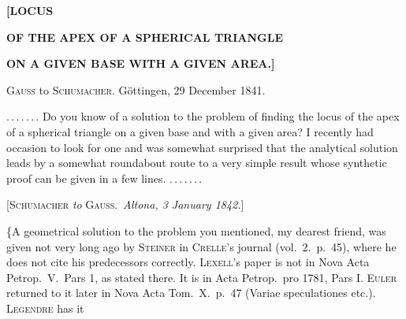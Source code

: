 \clearpage{}
\begin{center}
\textbf{[LOCUS}\par\medskip
\textbf{OF THE APEX OF A SPHERICAL TRIANGLE}\par\medskip
\textbf{ON A GIVEN BASE WITH A GIVEN AREA.]}
\end{center}

\medskip

\begin{center}
\textsc{Gauss} to \textsc{Schumacher}. Göttingen, 29 December 1841.
\end{center}

\mbox{.\,.\,.\,.\,.\,.\,.} Do you know of a  solution to the problem of finding the locus of the apex of a spherical triangle on a given base and with a given area? I recently had occasion to look for one and was somewhat surprised that the analytical solution leads by a somewhat roundabout route to a very simple result whose synthetic proof can be given in a few lines. \mbox{.\,.\,.\,.\,.\,.\,.}

\medskip

\begin{center}
[\textsc{Schumacher} \emph{to} \textsc{Gauss}.\ \emph{Altona, 3 January 1842.}]
\end{center}

\{A geometrical solution to the problem you mentioned, my dearest friend, was given not very long ago by \textsc{Steiner} in \textsc{Crelle}'s journal (vol.\ 2.\ p.\ 45), where he does not cite his predecessors correctly. \textsc{Lexell}'s paper is not in Nova Acta Petrop.\ V.\ Pars 1, as stated there. It is in Acta Petrop.\ pro 1781, Pars I. \textsc{Euler} returned to it later in Nova Acta Tom.\ X.\ p.\ 47 (Variae speculationes etc.). \textsc{Legendre} has it
